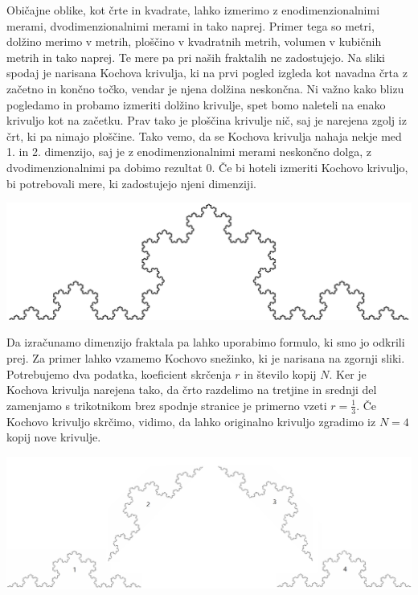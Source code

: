\documentclass[a4paper, 12px]{article}
\begin{document}
        \addvspace{1cm}
        Običajne oblike, kot črte in kvadrate, lahko izmerimo z enodimenzionalnimi merami, dvodimenzionalnimi merami in tako naprej.
        Primer tega so metri, dolžino merimo v metrih, ploščino v kvadratnih metrih, volumen v kubičnih metrih in tako naprej.
        Te mere pa pri naših fraktalih ne zadostujejo.
        Na sliki spodaj je narisana Kochova krivulja, ki na prvi pogled izgleda kot navadna črta z začetno in končno točko, vendar je njena dolžina neskončna.
        Ni važno kako blizu pogledamo in probamo izmeriti dolžino krivulje, spet bomo naleteli na enako krivuljo kot na začetku.
        Prav tako je ploščina krivulje nič, saj je narejena zgolj iz črt, ki pa nimajo ploščine.
        Tako vemo, da se Kochova krivulja nahaja nekje med 1. in 2. dimenzijo, saj je z enodimenzionalnimi merami neskončno dolga, z dvodimenzionalnimi pa dobimo rezultat 0.
        Če bi hoteli izmeriti Kochovo krivuljo, bi potrebovali mere, ki zadostujejo njeni dimenziji.
        \cite{FractalDefinitionVideo}
        \cite{FractalDefinition}
        \centerline{\includegraphics[scale=0.2]{koch-curve.png}}
        \begingroup
        \endgroup

        \addvspace{0.5cm}
        Da izračunamo dimenzijo fraktala pa lahko uporabimo formulo, ki smo jo odkrili prej.
        Za primer lahko vzamemo Kochovo snežinko, ki je narisana na zgornji sliki.
        Potrebujemo dva podatka, koeficient skrčenja $r$ in število kopij $N$.
        Ker je Kochova krivulja narejena tako, da črto razdelimo na tretjine in srednji del zamenjamo s trikotnikom brez spodnje stranice je primerno vzeti $r=\frac{1}{3}$.
        Če Kochovo krivuljo skrčimo, vidimo, da lahko originalno krivuljo zgradimo iz $N=4$ kopij nove krivulje.
        \cite{FractalDimensionsVideo}
        \centerline{\includegraphics[scale=0.2]{koch-curve-dimension.png}}
        \begingroup
        \endgroup
\end{document}
